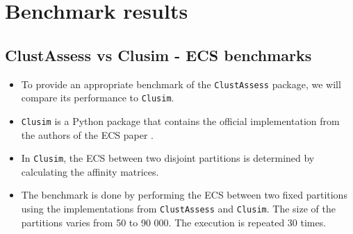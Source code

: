 \section{Benchmark results}

\subsection{ClustAssess vs Clusim - ECS benchmarks}

\begin{frame}
    \begin{itemize}[<+->]
        \item To provide an appropriate benchmark of the \texttt{ClustAssess} package, we will compare its performance to \texttt{Clusim}. 
        \item \texttt{Clusim} is a Python package that contains the official implementation from the authors of the ECS paper \cite{Gates2019b}.
        \item In \texttt{Clusim}, the ECS between two disjoint partitions is determined by calculating the affinity matrices.
        \item The benchmark is done by performing the ECS between two fixed partitions using the implementations from \texttt{ClustAssess} and \texttt{Clusim}. The size of the partitions varies from 50 to 90 000. The execution is repeated 30 times.
    \end{itemize}
\end{frame}

